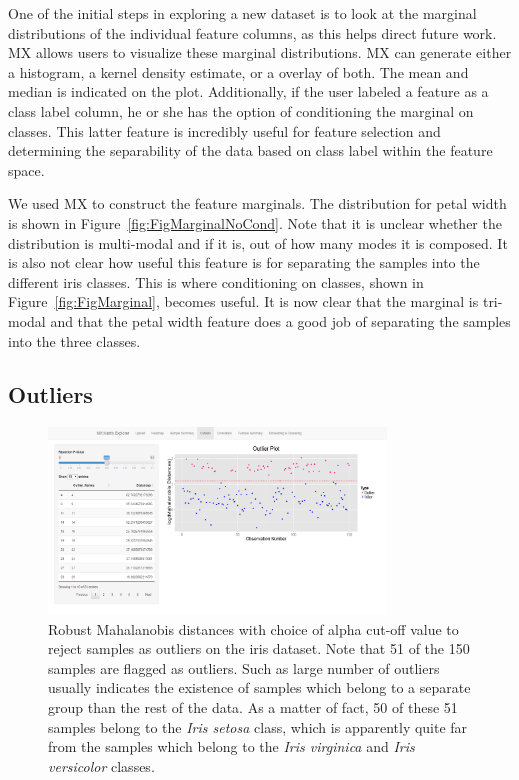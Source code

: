 \documentclass[12pt]{article}
\begin{document}
One of the initial steps in exploring a new dataset is to look at the marginal distributions of the individual feature columns, as this helps direct future work. MX allows users to visualize these marginal distributions. MX can generate either a histogram, a kernel density estimate, or a overlay of both. The mean and median is indicated on the plot. Additionally, if the user labeled a feature as a class label column, he or she has the option of conditioning the marginal on classes. This latter feature is incredibly useful for feature selection and determining the separability of the data based on class label within the feature space.

We used MX to construct the feature marginals. The distribution for petal width is shown in Figure~\ref{fig:FigMarginalNoCond}. Note that it is unclear whether the distribution is multi-modal and if it is, out of how many modes it is composed. It is also not clear how useful this feature is for separating the samples into the different iris classes. This is where conditioning on classes, shown in Figure~\ref{fig:FigMarginal}, becomes useful. It is now clear that the marginal is tri-modal and that the petal width feature does a good job of separating the samples into the three classes.

\subsection{Outliers}
\label{subsec:SubSecOutliers}

\begin{figure}[t!]
	\centering
	\includegraphics[width=0.8\textwidth]{Figures/Iris/OutliersIris.png}
	\caption{Robust Mahalanobis distances with choice of alpha cut-off value to reject samples as outliers on the iris dataset. Note that 51 of the 150 samples are flagged as outliers. Such as large number of outliers usually indicates the existence of samples which belong to a separate group than the rest of the data. As a matter of fact, 50 of these 51 samples belong to the \textit{Iris setosa} class, which is apparently quite far from the samples which belong to the \textit{Iris virginica} and \textit{Iris versicolor} classes.}
	\label{fig:FigOutliers}
\end{figure}
\end{document}
